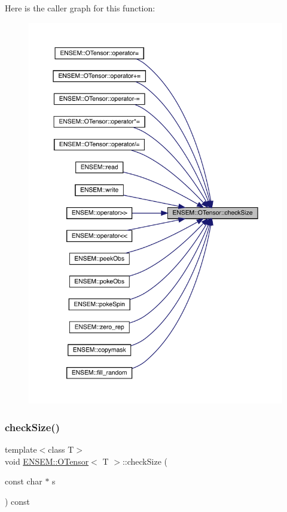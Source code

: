 Here is the caller graph for this function\+:\nopagebreak
\begin{figure}[H]
\begin{center}
\leavevmode
\includegraphics[width=350pt]{da/d8a/classENSEM_1_1OTensor_a09bfbf9385ec1bbe5050d4df43850f63_icgraph}
\end{center}
\end{figure}
\mbox{\label{classENSEM_1_1OTensor_a09bfbf9385ec1bbe5050d4df43850f63}} 
\subsubsection{\texorpdfstring{checkSize()}{checkSize()}\hspace{0.1cm}{\footnotesize\ttfamily [2/4]}}
{\footnotesize\ttfamily template$<$class T$>$ \\
void \mbox{\hyperlink{classENSEM_1_1OTensor}{E\+N\+S\+E\+M\+::\+O\+Tensor}}$<$ T $>$\+::check\+Size (\begin{DoxyParamCaption}\item[{const char $\ast$}]{s }\end{DoxyParamCaption}) const\hspace{0.3cm}{\ttfamily [inline]}}


